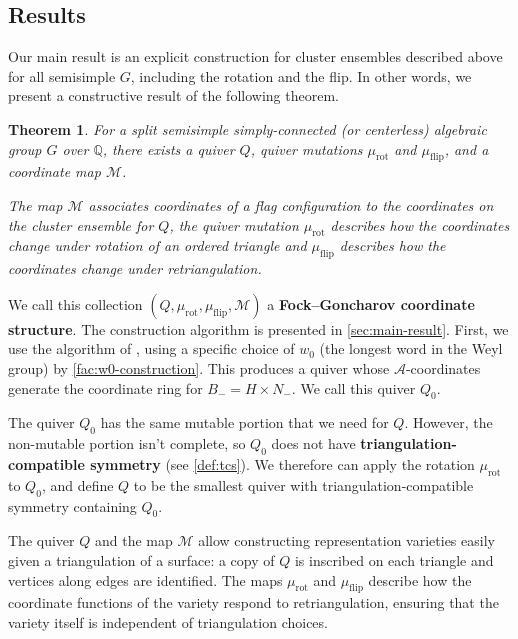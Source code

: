 \documentclass{amsart}
\theoremstyle{plain}
\newtheorem{theorem}{Theorem}[section]
\theoremstyle{definition}
\theoremstyle{remark}
\newcommand{\conftoquiv}{\mathcal{M}}
\newcommand{\defined}[1]{\textbf{#1}}
\newcommand{\muflip}{{\mu_{\text{flip}}}}
\newcommand{\murot}{{\mu_{\text{rot}}}}
\begin{document}
  \subsection{Results}

  Our main result is an explicit construction for cluster ensembles
  described above for all semisimple $G$, including the rotation and the
  flip. In other words, we present a constructive result of the
  following theorem.

  \begin{theorem}
    \label{thm:intro-main-result}
    For a split semisimple simply-connected (or centerless) algebraic
    group $G$ over $\mathbb{Q}$, there exists a quiver $Q$, quiver
    mutations $\murot$ and $\muflip$, and a coordinate map
    $\conftoquiv$.

    The map $\conftoquiv$ associates coordinates of a flag configuration
    to the coordinates on the cluster ensemble for $Q$, the quiver
    mutation $\murot$ describes how the coordinates change under
    rotation of an ordered triangle and $\muflip$ describes how the
    coordinates change under retriangulation.
  \end{theorem}

  We call this collection $(Q, \murot, \muflip, \conftoquiv)$ a
  \defined{Fock--Goncharov coordinate structure}. The construction
  algorithm is presented in \cref{sec:main-result}. First, we use the
  algorithm of \cite[Section~2]{fominzelevinsky1999}, using a specific
  choice of $w_0$ (the longest word in the Weyl group) by
  \cref{fac:w0-construction}. This produces a quiver whose
  $\mathcal{A}$-coordinates generate the coordinate ring for $B_{-} = H
  \times N_{-}$. We call this quiver $Q_0$.

  The quiver $Q_0$ has the same mutable portion that we need for $Q$.
  However, the non-mutable portion isn't complete, so $Q_0$ does not
  have \defined{triangulation-compatible symmetry} (see \cref{def:tcs}).
  We therefore can apply the rotation $\murot$ to $Q_0$, and define $Q$
  to be the smallest quiver with triangulation-compatible symmetry
  containing $Q_0$.

  The quiver $Q$ and the map $\conftoquiv$ allow constructing
  representation varieties easily given a triangulation of a surface: a
  copy of $Q$ is inscribed on each triangle and vertices along edges are
  identified. The maps $\murot$ and $\muflip$ describe how the
  coordinate functions of the variety respond to retriangulation,
  ensuring that the variety itself is independent of triangulation
  choices.
\end{document}
